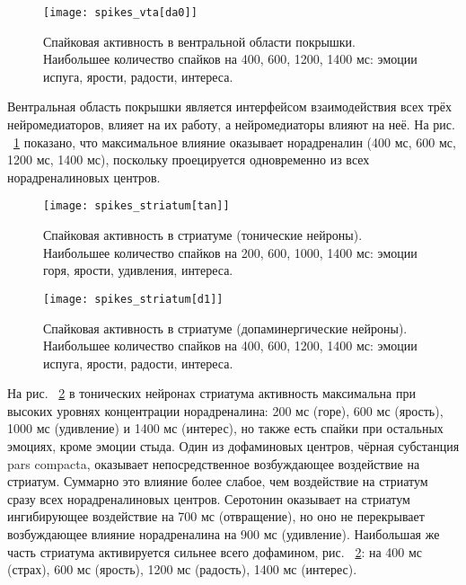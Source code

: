 \begin{figure}
	\centering
	\texttt{[image: spikes\_vta[da0]]}
	\caption{Спайковая активность в вентральной области покрышки. Наибольшее количество спайков на 400, 600, 1200, 1400 мс: эмоции испуга, ярости, радости, интереса.}
	\label{fig:spikes_vta}
\end{figure}

Вентральная область покрышки является интерфейсом взаимодействия всех трёх нейромедиаторов, влияет на их работу, а нейромедиаторы влияют на неё. На рис. ~\ref{fig:spikes_vta} показано, что максимальное влияние оказывает норадреналин (400 мс, 600 мс, 1200 мс, 1400 мс), поскольку проецируется одновременно из всех норадреналиновых центров.

\begin{figure}
	\centering
	\texttt{[image: spikes\_striatum[tan]]}
	\caption{Спайковая активность в стриатуме (тонические нейроны). Наибольшее количество спайков на 200, 600, 1000, 1400 мс: эмоции горя, ярости, удивления, интереса.}
	\label{fig:spikes_striatum}
\end{figure}

\begin{figure}
	\centering
	\texttt{[image: spikes\_striatum[d1]]}
	\caption{Спайковая активность в стриатуме (допаминергические нейроны). Наибольшее количество спайков на 400, 600, 1200, 1400 мс: эмоции испуга, ярости, радости, интереса.}
	\label{fig:spikes_striatumх[d1]}
\end{figure}


На рис. ~\ref{fig:spikes_striatum} в тонических нейронах стриатума активность максимальна при высоких уровнях концентрации норадреналина: 200 мс (горе), 600 мс (ярость), 1000 мс (удивление) и 1400 мс (интерес), но также есть спайки при остальных эмоциях, кроме эмоции стыда. Один из дофаминовых центров, чёрная субстанция pars compacta, оказывает непосредственное возбуждающее воздействие на стриатум. Суммарно это влияние более слабое, чем воздействие на стриатум сразу всех норадреналиновых центров. Серотонин оказывает на стриатум ингибирующее воздействие на 700 мс (отвращение), но оно не перекрывает возбуждающее влияние норадреналина на 900 мс (удивление). Наибольшая же часть стриатума активируется сильнее всего дофамином, рис. ~\ref{fig:spikes_striatum}: на 400 мс (страх), 600 мс (ярость), 1200 мс (радость), 1400 мс (интерес).



